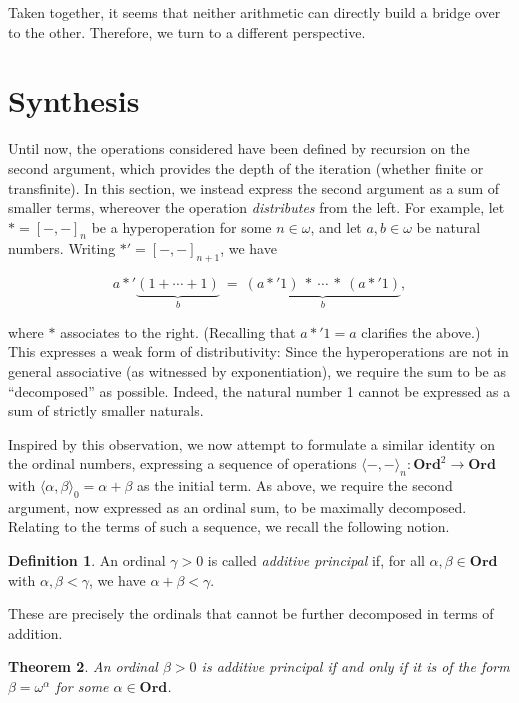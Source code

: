 \documentclass[12pt, a4paper]{article}
\newtheorem{theorem}{Theorem}[section]
\theoremstyle{definition}
\newtheorem{definition}[theorem]{Definition}
\theoremstyle{remark}
\newcommand{\ord}{\mathbf{Ord}}
\newcommand{\op}[2]{\langle#1, #2\rangle}
\begin{document}
Taken together, it seems that neither arithmetic can directly build a bridge over to the other. Therefore, we turn to a different perspective.

\section{Synthesis}

Until now, the operations considered have been defined by recursion on the second argument, which provides the depth of the iteration (whether finite or transfinite). In this section, we instead express the second argument as a sum of smaller terms, whereover the operation \emph{distributes} from the left. For example, let $* = [-,-]_n$ be a hyperoperation for some $n \in \omega$, and let $a, b \in \omega$ be natural numbers. Writing $*' = [-,-]_{n+1}$, we have

\[a *' \underbrace{(1+\cdots+1)}_{b}\ =\ \underbrace{(a *' 1)\ *\ \cdots\ *\ (a *' 1)}_{b},\]

where $*$ associates to the right. (Recalling that $a *' 1 = a$ clarifies the above.) This expresses a weak form of distributivity: Since the hyperoperations are not in general associative (as witnessed by exponentiation), we require the sum to be as ``decomposed'' as possible. Indeed, the natural number 1 cannot be expressed as a sum of strictly smaller naturals.

Inspired by this observation, we now attempt to formulate a similar identity on the ordinal numbers, expressing a sequence of operations $\op--_n : \ord^2 \to \ord$ with $\op\alpha\beta_0 = \alpha + \beta$ as the initial term. As above, we require the second argument, now expressed as an ordinal sum, to be maximally decomposed. Relating to the terms of such a sequence, we recall the following notion.

\begin{definition}
    An ordinal $\gamma > 0$ is called \emph{additive principal} if, for all $\alpha, \beta \in \ord$ with $\alpha, \beta < \gamma$, we have $\alpha+\beta < \gamma$.
\end{definition}

These are precisely the ordinals that cannot be further decomposed in terms of addition.

\begin{theorem}
    An ordinal $\beta > 0$ is additive principal if and only if it is of the form $\beta = \omega^\alpha$ for some $\alpha \in \ord$.
\end{theorem}
\end{document}
